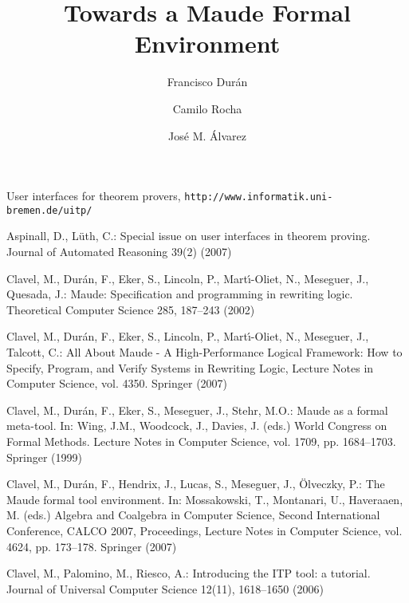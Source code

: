 \documentclass{llncs}
\title{Towards a Maude Formal Environment}
\author{Francisco Dur\'an\inst{1} \and Camilo Rocha\inst{2} \and Jos\'e M. \'Alvarez\inst{1}}
\institute{
Universidad de M\'alaga, Spain. %
\and
University of Illinois at Urbana-Champaign, IL, USA. %
}
\begin{document}
\maketitle









%



%
\begin{thebibliography}{10}
\providecommand{\url}[1]{\texttt{#1}}
\providecommand{\urlprefix}{URL }

User interfaces for theorem provers,
  \url{http://www.informatik.uni-bremen.de/uitp/}

Aspinall, D., L\"uth, C.: Special issue on user interfaces in theorem proving.
  Journal of Automated Reasoning  39(2) (2007)

Clavel, M., Dur{\'a}n, F., Eker, S., Lincoln, P., Mart\'{\i}-Oliet, N.,
  Meseguer, J., Quesada, J.: {Maude}: Specification and programming in
  rewriting logic. Theoretical Computer Science  285,  187--243 (2002)

Clavel, M., Dur\'{a}n, F., Eker, S., Lincoln, P., Mart\'{\i}-Oliet, N.,
  Meseguer, J., Talcott, C.: All About {Maude} - A High-Performance Logical
  Framework: How to Specify, Program, and Verify Systems in Rewriting Logic,
  Lecture Notes in Computer Science, vol. 4350. Springer (2007)

Clavel, M., Dur{\'a}n, F., Eker, S., Meseguer, J., Stehr, M.O.: {M}aude as a
  formal meta-tool. In: Wing, J.M., Woodcock, J., Davies, J. (eds.) World
  Congress on Formal Methods. Lecture Notes in Computer Science, vol. 1709, pp.
  1684--1703. Springer (1999)

Clavel, M., Dur\'an, F., Hendrix, J., Lucas, S., Meseguer, J., \"Olveczky, P.:
  The {Maude} formal tool environment. In: Mossakowski, T., Montanari, U.,
  Haveraaen, M. (eds.) Algebra and Coalgebra in Computer Science, Second
  International Conference, CALCO 2007, Proceedings, Lecture Notes in Computer
  Science, vol. 4624, pp. 173--178. Springer (2007)

Clavel, M., Palomino, M., Riesco, A.: Introducing the {ITP} tool: a tutorial.
  Journal of Universal Computer Science  12(11),  1618--1650 (2006)


\end{thebibliography}
\end{document}
